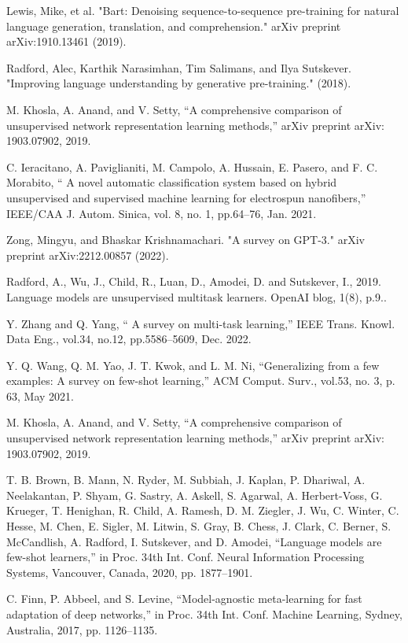 \documentclass[conference]{IEEEtran}
\begin{document}
\begin{thebibliography}{00}
 Lewis, Mike, et al. "Bart: Denoising sequence-to-sequence pre-training for natural language generation, translation, and comprehension." arXiv preprint arXiv:1910.13461 (2019).

 Radford, Alec, Karthik Narasimhan, Tim Salimans, and Ilya Sutskever. "Improving language understanding by generative pre-training." (2018).

 M. Khosla, A. Anand, and V. Setty, “A comprehensive comparison of unsupervised network representation learning methods,” arXiv preprint arXiv: 1903.07902, 2019.

 C. Ieracitano, A. Paviglianiti, M. Campolo, A. Hussain, E. Pasero, and F. C. Morabito, “ A novel automatic classification system based on hybrid unsupervised and supervised machine learning for electrospun nanofibers,” IEEE/CAA J. Autom. Sinica, vol. 8, no. 1, pp.64–76, Jan. 2021.


 Zong, Mingyu, and Bhaskar Krishnamachari. "A survey on GPT-3." arXiv preprint arXiv:2212.00857 (2022).

 Radford, A., Wu, J., Child, R., Luan, D., Amodei, D. and Sutskever, I., 2019. Language models are unsupervised multitask learners. OpenAI blog, 1(8), p.9..

 Y. Zhang and Q. Yang, “ A survey on multi-task learning,” IEEE Trans. Knowl. Data Eng., vol.34, no.12, pp.5586–5609, Dec. 2022.

 Y. Q. Wang, Q. M. Yao, J. T. Kwok, and L. M. Ni, “Generalizing from a few examples: A survey on few-shot learning,” ACM Comput. Surv., vol.53, no. 3, p. 63, May 2021.

 M. Khosla, A. Anand, and V. Setty, “A comprehensive comparison of unsupervised network representation learning methods,” arXiv preprint arXiv: 1903.07902, 2019.

 T. B. Brown, B. Mann, N. Ryder, M. Subbiah, J. Kaplan, P. Dhariwal, A. Neelakantan, P. Shyam, G. Sastry, A. Askell, S. Agarwal, A. Herbert-Voss, G. Krueger, T. Henighan, R. Child, A. Ramesh, D. M. Ziegler, J. Wu, C. Winter, C. Hesse, M. Chen, E. Sigler, M. Litwin, S. Gray, B. Chess, J. Clark, C. Berner, S. McCandlish, A. Radford, I. Sutskever, and D. Amodei, “Language models are few-shot learners,” in Proc. 34th Int. Conf. Neural Information Processing Systems, Vancouver, Canada, 2020, pp. 1877–1901.


 C. Finn, P. Abbeel, and S. Levine, “Model-agnostic meta-learning for fast adaptation of deep networks,” in Proc. 34th Int. Conf. Machine Learning, Sydney, Australia, 2017, pp. 1126–1135.


\end{thebibliography}
\end{document}
